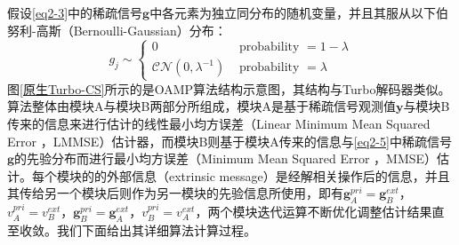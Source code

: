 \documentclass{xdupgthesis}
\begin{document}
假设\eqref{eq2-3}中的稀疏信号$\mathbf{g}$中各元素为独立同分布的随机变量，并且其服从以下伯努利-高斯（Bernoulli-Gaussian）分布：
\begin{equation}
    \label{eq2-5}
    g_{j} \sim\left\{\begin{array}{ll}
        0 & \text { probability }=1-\lambda \\
        \mathcal{C N}\left(0, \lambda^{-1}\right) & \text { probability }=\lambda
        \end{array}\right.
\end{equation}
图\ref{原生Turbo-CS}所示的是OAMP算法结构示意图，其结构与Turbo解码器\parencite{berrou1996near}类似。算法整体由模块A与模块B两部分所组成，模块A是基于稀疏信号观测值$\mathbf{y}$与模块B传来的信息来进行估计的线性最小均方误差（Linear Minimum Mean Squared Error
，LMMSE）估计器，而模块B则基于模块A传来的信息与\eqref{eq2-5}中稀疏信号$\mathbf{g}$的先验分布而进行最小均方误差（Minimum Mean Squared Error
，MMSE）估计。每个模块的的外部信息（extrinsic message）是经解相关操作后的信息，并且其传给另一个模块后则作为另一模块的先验信息所使用，即有$\mathbf{g}_{A}^{pri} = \mathbf{g}_{B}^{ext}$，${v}_{A}^{pri} = {v}_{B}^{ext}$，$\mathbf{g}_{B}^{pri} = \mathbf{g}_{A}^{ext}$，${v}_{B}^{pri} = {v}_{A}^{ext}$，两个模块迭代运算不断优化调整估计结果直至收敛。我们下面给出其详细算法计算过程。
\end{document}
